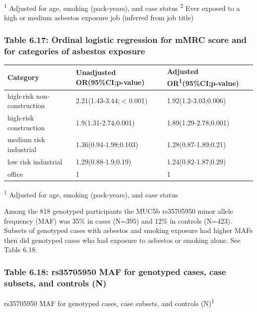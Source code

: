\textsuperscript{1} Adjusted for age, smoking (pack-years), and case
status \textsuperscript{2} Ever exposed to a high or medium asbestos
exposure job (inferred from job title)

\hypertarget{table-6.17-ordinal-logistic-regression-for-mmrc-score-and-for-categories-of-asbestos-exposure}{%
\subsubsection{Table 6.17: Ordinal logistic regression for mMRC score
and for categories of asbestos
exposure}\label{table-6.17-ordinal-logistic-regression-for-mmrc-score-and-for-categories-of-asbestos-exposure}}

\begin{longtable}[]{@{}lll@{}}
\toprule
Category & Unadjusted OR(95\%CI;p-value) & Adjusted
OR\textsuperscript{1}(95\%CI;p-value)\tabularnewline
\midrule
\endhead
high-risk non-construction & 2.21(1.43-3.44;\ensuremath{<}0.001) &
1.92(1.2-3.03;0.006)\tabularnewline
high-risk construction & 1.9(1.31-2.74;0.001) &
1.89(1.29-2.78;0.001)\tabularnewline
medium risk industrial & 1.36(0.94-1.98;0.103) &
1.28(0.87-1.89;0.21)\tabularnewline
low risk industrial & 1.29(0.88-1.9;0.19) &
1.24(0.82-1.87;0.29)\tabularnewline
office & 1 & 1\tabularnewline
\bottomrule
\end{longtable}

\textsuperscript{1} Adjusted for age, smoking (pack-years), and case
status

Among the 818 genotyped participants the MUC5b rs35705950 minor allele
frequency (MAF) was 35\% in cases (N=395) and 12\% in controls (N=423).
Subsets of genotyped cases with asbestos and smoking exposure had higher
MAFs then did genotyped cases who had exposure to asbestos or smoking
alone. See Table 6.18.

\newpage

\hypertarget{table-6.18-rs35705950-maf-for-genotyped-cases-case-subsets-and-controls-n}{%
\subsubsection{Table 6.18: rs35705950 MAF for genotyped cases, case
subsets, and controls
(N)}\label{table-6.18-rs35705950-maf-for-genotyped-cases-case-subsets-and-controls-n}}

rs35705950 MAF for genotyped cases, case subsets, and controls
(N)\textsuperscript{1}

